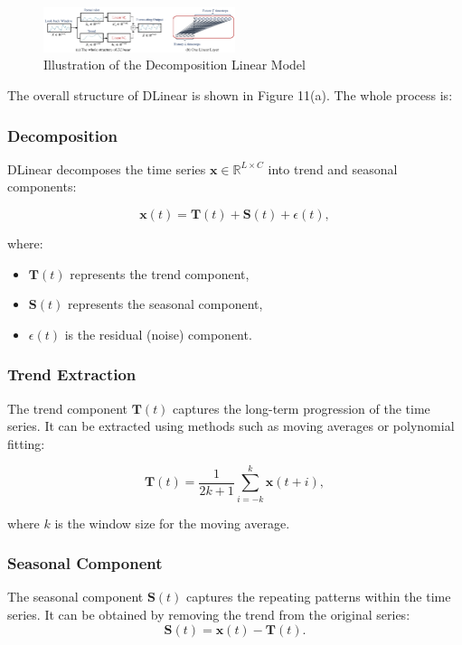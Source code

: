 \documentclass{ieeeojies}
\begin{document}
\begin{figure} [H]
    \centering
    \includegraphics[width=0.5\textwidth]{bibliography/Figure/Illu_DLinear.png}
    \caption{Illustration of the Decomposition Linear Model}
    \label{fig:DLinear Illustration}
\end{figure}

The overall structure of DLinear is shown in Figure 11(a). The whole process is:

\subsubsection{Decomposition}
DLinear decomposes the time series $\mathbf{x} \in \mathbb{R}^{L \times C}$ into trend and seasonal components:

\begin{equation}
    \mathbf{x}(t) = \mathbf{T}(t) + \mathbf{S}(t) + \epsilon(t),
\end{equation}

where:
\begin{itemize}
    \item $\mathbf{T}(t)$ represents the trend component,
    \item $\mathbf{S}(t)$ represents the seasonal component,
    \item $\epsilon(t)$ is the residual (noise) component.
\end{itemize}

\subsubsection{Trend Extraction}
The trend component $\mathbf{T}(t)$ captures the long-term progression of the time series. It can be extracted using methods such as moving averages or polynomial fitting:

\begin{equation}
    \mathbf{T}(t) = \frac{1}{2k+1} \sum_{i=-k}^{k} \mathbf{x}(t+i),
\end{equation}

where $k$ is the window size for the moving average.

\subsubsection{Seasonal Component}
The seasonal component $\mathbf{S}(t)$ captures the repeating patterns within the time series. It can be obtained by removing the trend from the original series:
\begin{equation}
    \mathbf{S}(t) = \mathbf{x}(t) - \mathbf{T}(t).
\end{equation}
\end{document}
